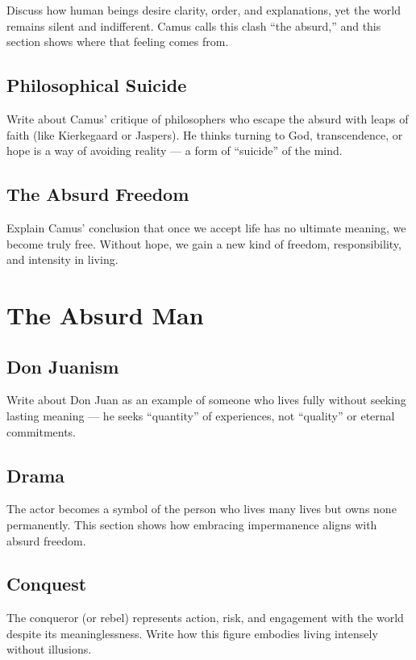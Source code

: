 \documentclass[12pt,letterpaper]{book}
\theoremstyle{definition}
\theoremstyle{remark}
\begin{document}
Discuss how human beings desire clarity, order, and explanations, yet the world remains silent and indifferent. Camus calls this clash \enquote{the absurd,} and this section shows where that feeling comes from.

\section{Philosophical Suicide}

Write about Camus' critique of philosophers who escape the absurd with leaps of faith (like Kierkegaard or Jaspers). He thinks turning to God, transcendence, or hope is a way of avoiding reality — a form of \enquote{suicide} of the mind.

\section{The Absurd Freedom}

Explain Camus' conclusion that once we accept life has no ultimate meaning, we become truly free. Without hope, we gain a new kind of freedom, responsibility, and intensity in living.

\chapter{The Absurd Man}

\section{Don Juanism}

Write about Don Juan as an example of someone who lives fully without seeking lasting meaning — he seeks \enquote{quantity} of experiences, not \enquote{quality} or eternal commitments.

\section{Drama}

The actor becomes a symbol of the person who lives many lives but owns none permanently. This section shows how embracing impermanence aligns with absurd freedom.

\section{Conquest}

The conqueror (or rebel) represents action, risk, and engagement with the world despite its meaninglessness. Write how this figure embodies living intensely without illusions.
\end{document}
